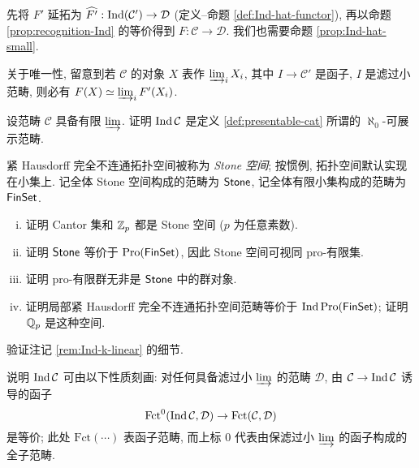 \begin{Exercises}
	\begin{hint}
		先将 $F'$ 延拓为 $\widehat{F'}: \operatorname{Ind}(\mathcal{C}') \to \mathcal{D}$ (定义--命题 \ref{def:Ind-hat-functor}), 再以命题 \ref{prop:recognition-Ind} 的等价得到 $F: \mathcal{C} \to \mathcal{D}$. 我们也需要命题 \ref{prop:Ind-hat-small}.
		
		关于唯一性, 留意到若 $\mathcal{C}$ 的对象 $X$ 表作 $\varinjlim_i X_i$, 其中 $I \to \mathcal{C}'$ 是函子, $I$ 是滤过小范畴, 则必有 $F(X) \simeq \varinjlim_i F'(X_i)$.
	\end{hint}
	
	\item 设范畴 $\mathcal{C}$ 具备有限 $\varinjlim$. 证明 $\operatorname{Ind}\mathcal{C}$ 是定义 \ref{def:presentable-cat} 所谓的 $\aleph_0$-可展示范畴.
	
	\item 紧 Hausdorff 完全不连通拓扑空间被称为 \emph{Stone 空间}; 按惯例, 拓扑空间默认实现在小集上. 记全体 Stone 空间构成的范畴为 $\mathsf{Stone}$, 记全体有限小集构成的范畴为 $\mathsf{FinSet}$.
	\begin{enumerate}[(i)]
		\item 证明 Cantor 集和 $\mathbb{Z}_p$ 都是 Stone 空间 ($p$ 为任意素数).
		\item 证明 $\mathsf{Stone}$ 等价于 $\operatorname{Pro}(\mathsf{FinSet})$, 因此 Stone 空间可视同 pro-有限集.
		\item 证明 pro-有限群无非是 $\mathsf{Stone}$ 中的群对象.
		\item 证明局部紧 Hausdorff 完全不连通拓扑空间范畴等价于 $\operatorname{Ind}\operatorname{Pro}(\mathsf{FinSet})$; 证明 $\mathbb{Q}_p$ 是这种空间.
	\end{enumerate}
	
	\item 验证注记 \ref{rem:Ind-k-linear} 的细节.
	
	\item 说明 $\operatorname{Ind}\mathcal{C}$ 可由以下性质刻画: 对任何具备滤过小 $\varinjlim$ 的范畴 $\mathcal{D}$, 由 $\mathcal{C} \to \operatorname{Ind}\mathcal{C}$ 诱导的函子
	\[ \mathrm{Fct}^0(\operatorname{Ind}\mathcal{C}, \mathcal{D}) \to \mathrm{Fct}(\mathcal{C}, \mathcal{D}) \]
	是等价; 此处 $\mathrm{Fct}(\cdots)$ 表函子范畴, 而上标 $0$ 代表由保滤过小 $\varinjlim$ 的函子构成的全子范畴.
\end{Exercises}